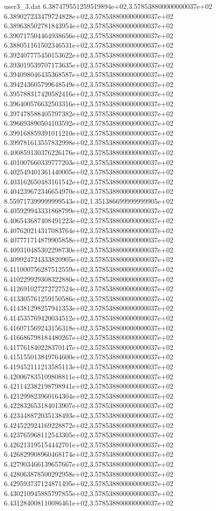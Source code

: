 \begin{filecontents}{user3_3.dat}
6.387479551259519894e+02,3.578538800000000037e+02
6.389027233479724828e+02,3.578538800000000037e+02
6.389638502781843954e+02,3.578538800000000037e+02
6.390717504464938656e+02,3.578538800000000037e+02
6.388051161502346531e+02,3.578538800000000037e+02
6.392407775450153622e+02,3.578538800000000037e+02
6.393019539707173635e+02,3.578538800000000037e+02
6.394098046435368587e+02,3.578538800000000037e+02
6.394243605799648549e+02,3.578538800000000037e+02
6.395788317420582416e+02,3.578538800000000037e+02
6.396400576632503316e+02,3.578538800000000037e+02
6.397478588405797382e+02,3.578538800000000037e+02
6.396693890504103592e+02,3.578538800000000037e+02
6.399168859391011210e+02,3.578538800000000037e+02
6.399781613557832998e+02,3.578538800000000037e+02
6.400859130376226176e+02,3.578538800000000037e+02
6.401007660339777203e+02,3.578538800000000037e+02
6.402549401361440005e+02,3.578538800000000037e+02
6.403162650483161542e+02,3.578538800000000037e+02
6.404239672346654970e+02,3.578538800000000037e+02
8.559717399999999543e+02,1.351386699999999905e+02
6.405929943331868799e+02,3.578538800000000037e+02
6.406543687408491223e+02,3.578538800000000037e+02
6.407620214317083764e+02,3.578538800000000037e+02
6.407771714879905858e+02,3.578538800000000037e+02
6.409310485302298730e+02,3.578538800000000037e+02
6.409924724333820905e+02,3.578538800000000037e+02
6.411000756287512559e+02,3.578538800000000037e+02
6.410229929308322880e+02,3.578538800000000037e+02
6.412691027272727524e+02,3.578538800000000037e+02
6.413305761259150586e+02,3.578538800000000037e+02
6.414381298257941353e+02,3.578538800000000037e+02
6.414535769420034512e+02,3.578538800000000037e+02
6.416071569243156318e+02,3.578538800000000037e+02
6.416686798184480267e+02,3.578538800000000037e+02
6.417761840228370147e+02,3.578538800000000037e+02
6.415155013849764600e+02,3.578538800000000037e+02
6.419452111213585113e+02,3.578538800000000037e+02
6.420067835109808811e+02,3.578538800000000037e+02
6.421142382198798941e+02,3.578538800000000037e+02
6.421299823960164304e+02,3.578538800000000037e+02
6.422832653184013907e+02,3.578538800000000037e+02
6.423448872035138493e+02,3.578538800000000037e+02
6.424522924169228872e+02,3.578538800000000037e+02
6.423765968112543305e+02,3.578538800000000037e+02
6.426213195154442701e+02,3.578538800000000037e+02
6.426829908960468174e+02,3.578538800000000037e+02
6.427903466139657667e+02,3.578538800000000037e+02
6.428063878500292958e+02,3.578538800000000037e+02
6.429593737124871495e+02,3.578538800000000037e+02
6.430210945885797855e+02,3.578538800000000037e+02
6.431284008110086461e+02,3.578538800000000037e+02

\end{filecontents}
